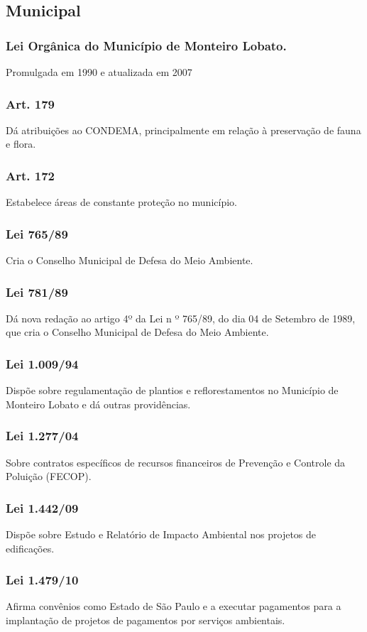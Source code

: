 \begin{subapend}
	\subsection{Municipal}
	\begin{subsubapend}
		\subsubsection{Lei Orgânica do Município de Monteiro Lobato.} 
		Promulgada em 1990 e atualizada em 2007
		\subsubsection{Art. 179}
		Dá atribuições ao CONDEMA, principalmente em relação à preservação de fauna e flora.
		\subsubsection{Art. 172}
		Estabelece áreas de constante proteção no município.
		\subsubsection{Lei 765/89}
		Cria o Conselho Municipal de Defesa do Meio Ambiente.
		\subsubsection{Lei 781/89}
		Dá nova redação ao artigo 4º da Lei n º 765/89, do dia 04 de Setembro de 1989, que cria o Conselho Municipal de Defesa do Meio Ambiente.
		\subsubsection{Lei 1.009/94}
		Dispõe sobre regulamentação de plantios e reflorestamentos no Município de Monteiro Lobato e dá outras providências.
		\subsubsection{Lei 1.277/04}
		Sobre contratos específicos de recursos financeiros de Prevenção e Controle da Poluição (FECOP).
		\subsubsection{Lei 1.442/09}
		Dispõe sobre Estudo e Relatório de Impacto Ambiental nos projetos de edificações.
		\subsubsection{Lei 1.479/10}
		Afirma convênios como Estado de São Paulo e a executar pagamentos para a implantação de projetos de pagamentos por serviços ambientais.

\end{subsubapend}
\end{subapend}
